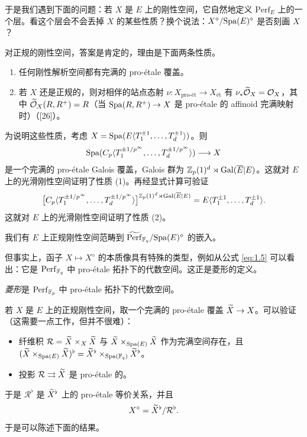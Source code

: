 于是我们遇到下面的问题：若 $X$ 是 $E$ 上的刚性空间，它自然地定义 $\mathrm{Perf}_E$ 上的一个层。看这个层会不会丢掉 $X$ 的某些性质？换个说法：$X^\diamond/\mathrm{Spa}(E)^\diamond$ 是否刻画 $X$？

对正规的刚性空间，答案是肯定的，理由是下面两条性质。

\begin{proposition}\label{prop:1.10}
\begin{enumerate}[label=(\arabic*)]
  \item 任何刚性解析空间都有完满的 pro-étale 覆盖。
  \item 若 $X$ 还是正规的，则对相伴的站点态射 $\nu:X_{\mathrm{pro\text{-}ét}}\to X_{\mathrm{ét}}$ 有 $\nu_*\widetilde{\mathcal{O}}_X=\mathcal{O}_X$，其中 $\widetilde{\mathcal{O}}_X(R,R^+)=R$（当 $\mathrm{Spa}(R,R^+)\to X$ 是 pro-étale 的 affinoid 完满映射时）（[26]）。
\end{enumerate}
\end{proposition}

为说明这些性质，考虑 $X=\mathrm{Spa}(E\langle T_1^{\pm1},\dots,T_d^{\pm1}\rangle)$。则
\[
  \mathrm{Spa}(C_p\langle T_1^{\pm1/p^\infty},\dots,T_d^{\pm1/p^\infty}\rangle)\longrightarrow X
\]
是一个完满的 pro-étale Galois 覆盖，Galois 群为 $\mathbb{Z}_p(1)^d\rtimes\operatorname{Gal}(\overline{E}|E)$。这就对 $E$ 上的光滑刚性空间证明了性质 (1)。再经显式计算可验证
\[
  \bigl[C_p\langle T_1^{\pm1/p^\infty},\dots,T_d^{\pm1/p^\infty}\rangle\bigr]^{\mathbb{Z}_p(1)^d\rtimes\operatorname{Gal}(\overline{E}|E)}=E\langle T_1^{\pm1},\dots,T_d^{\pm1}\rangle.
\]
这就对 $E$ 上的光滑刚性空间证明了性质 (2)。

\begin{corollary}\label{cor:1.11}
我们有 $E$ 上正规刚性空间范畴到 $\widetilde{\mathrm{Perf}}_{\mathbb{F}_q}/\mathrm{Spa}(E)^\diamond$ 的嵌入。
\end{corollary}

但事实上，函子 $X\mapsto X^\diamond$ 的本质像具有特殊的类型，例如从公式 \eqref{eq:1.5} 可以看出：它是 $\mathrm{Perf}_{\mathbb{F}_q}$ 中 pro-étale 拓扑下的代数空间。这正是菱形的定义。

\begin{definition}[Scholze {[27]}]\label{def:1.12}
\emph{菱形}是 $\mathrm{Perf}_{\mathbb{F}_p}$ 中 pro-étale 拓扑下的代数空间。
\end{definition}

若 $X$ 是 $E$ 上的正规刚性空间，取一个完满的 pro-étale 覆盖 $\widetilde{X}\to X$。可以验证（这需要一点工作，但并不很难）：
\begin{itemize}
  \item 纤维积 $\mathcal{R}=\widetilde{X}\times_X\widetilde{X}$ 与 $\widetilde{X}\times_{\mathrm{Spa}(E)}\widetilde{X}$ 作为完满空间存在，且 $(\widetilde{X}\times_{\mathrm{Spa}(E)}\widetilde{X})^\flat=\widetilde{X}^\flat\times_{\mathrm{Spa}(\mathbb{F}_q)}\widetilde{X}^\flat$。
  \item 投影 $\mathcal{R}\rightrightarrows\widetilde{X}$ 是 pro-étale 的。
\end{itemize}
于是 $\mathcal{R}^\flat$ 是 $\widetilde{X}^\flat$ 上的 pro-étale 等价关系，并且
\[
  X^\diamond=\widetilde{X}^\flat/\mathcal{R}^\flat.
\]
于是可以陈述下面的结果。

